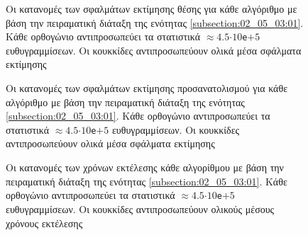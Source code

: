 \begin{figure}\vspace{1cm}\hspace{0.5cm}
  
  \vspace{-4cm}
  \caption{\small Οι κατανομές των σφαλμάτων εκτίμησης θέσης για κάθε αλγόριθμο
           με βάση την πειραματική διάταξη της ενότητας
           \ref{subsection:02_05_03:01}. Κάθε ορθογώνιο αντιπροσωπεύει τα
           στατιστικά $\approx 4.5$$\cdot$$10$\texttt{e}$+$$5$ ευθυγραμμίσεων.
           Οι κουκκίδες αντιπροσωπεύουν ολικά μέσα σφάλματα εκτίμησης}
  \label{fig:02_05_03:02:01}
\end{figure}

\begin{figure}\vspace{1cm}\hspace{0.5cm}
  
  \vspace{-4cm}
  \caption{\small Οι κατανομές των σφαλμάτων εκτίμησης προσανατολισμού για κάθε
           αλγόριθμο με βάση την πειραματική διάταξη της ενότητας
           \ref{subsection:02_05_03:01}. Κάθε ορθογώνιο αντιπροσωπεύει τα
           στατιστικά $\approx 4.5$$\cdot$$10$\texttt{e}$+$$5$ ευθυγραμμίσεων.
           Οι κουκκίδες αντιπροσωπεύουν ολικά μέσα σφάλματα εκτίμησης}
  \label{fig:02_05_03:02:02}
\end{figure}

\begin{figure}\vspace{1cm}\hspace{0.5cm}
  
  \vspace{-4cm}
  \caption{\small Οι κατανομές των χρόνων εκτέλεσης κάθε
           αλγορίθμου με βάση την πειραματική διάταξη της ενότητας
           \ref{subsection:02_05_03:01}. Κάθε ορθογώνιο αντιπροσωπεύει τα
           στατιστικά $\approx 4.5$$\cdot$$10$\texttt{e}$+$$5$ ευθυγραμμίσεων.
           Οι κουκκίδες αντιπροσωπεύουν ολικούς μέσους χρόνους εκτέλεσης}
  \label{fig:02_05_03:02:03}
\end{figure}


